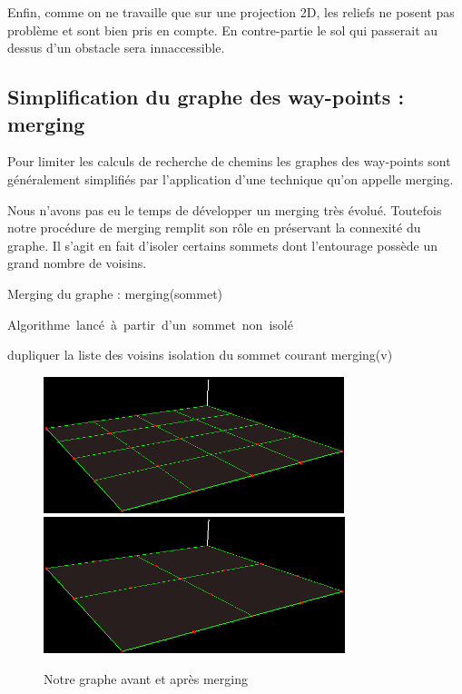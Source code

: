 \documentclass[a4paper,12pt]{report}
\begin{document}
Enfin, comme on ne travaille que sur une projection 2D, les reliefs ne posent pas problème et sont bien pris en compte. En contre-partie le sol qui passerait au dessus d'un obstacle sera innaccessible.

\newpage

\subsection{Simplification du graphe des way-points : merging}

Pour limiter les calculs de recherche de chemins les graphes des way-points sont généralement simplifiés par l'application d'une technique qu'on appelle merging. 

Nous n'avons pas eu le temps de développer un merging très évolué. Toutefois notre procédure de merging remplit son rôle en préservant la connexité du graphe. Il s'agit en fait d'isoler certains sommets dont l'entourage possède un grand nombre de voisins. 

\begin{algorithm}[!h]
\caption{Merging du graphe : merging(sommet)}
\label{merging_graphe}
\mbox{Algorithme lancé à partir d'un sommet non isolé}
\begin{algorithmic}[1]
  \STATE dupliquer la liste des voisins
      \STATE isolation du sommet courant
    \ENDIF
  \ENDIF
    \STATE merging(v)
  \ENDFOR
\ENDIF
\end{algorithmic}
\end{algorithm}

\begin{figure}[!h]
\centering
\includegraphics[scale=0.6]{Images/maillage.png}
\includegraphics[scale=0.6]{Images/merging.png}
\caption{Notre graphe avant et après merging}
\end{figure}
\vspace{0.5cm}
\end{document}
